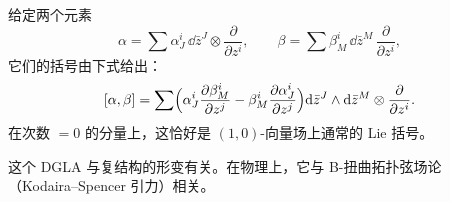 给定两个元素
\[
  \alpha=\sum\alpha^{i}_{J}\,\dd\bar z^{J}\otimes\frac{\partial}{\partial z^{i}},
  \qquad
  \beta=\sum\beta^{i}_{M}\,\dd\bar z^{M}\,\frac{\partial}{\partial z^{i}},
\]
它们的括号由下式给出：
\[
  [\alpha,\beta]
  =\sum\Bigl(\alpha^{i}_{J}\frac{\partial\beta^{i}_{M}}{\partial z^{j}}
  -\beta^{i}_{M}\frac{\partial\alpha^{i}_{J}}{\partial z^{j}}\Bigr)
  \mathrm{d}\bar z^{J}\wedge \mathrm{d}\bar z^{M}\otimes\frac{\partial}{\partial z^{i}}.
\]
在次数 $=0$ 的分量上，这恰好是 $(1,0)$-向量场上通常的 Lie 括号。


这个 DGLA 与复结构的形变有关。在物理上，它与 B-扭曲拓扑弦场论
（Kodaira--Spencer 引力）相关。

